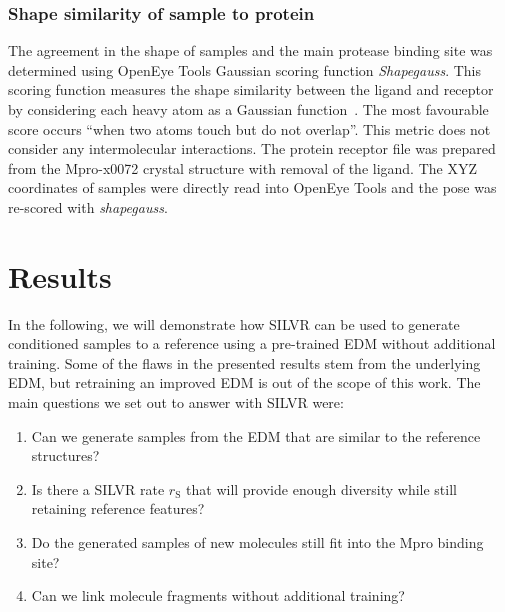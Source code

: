\documentclass[journal=jacsat,manuscript=article]{achemso}
\begin{document}
\subsubsection{Shape similarity of sample to protein}
The agreement in the shape of samples and the main protease binding site was determined using OpenEye Tools Gaussian scoring function \textit{Shapegauss}. This scoring function measures the shape similarity between the ligand and receptor by considering each heavy atom as a Gaussian function~\cite{mcgann2003gaussian}. The most favourable score occurs “when two atoms touch but do not overlap”.  This metric does not consider any intermolecular interactions. The protein receptor file was prepared from the Mpro-x0072 crystal structure with removal of the ligand. The XYZ coordinates of samples were directly read into OpenEye Tools and the pose was re-scored with \textit{shapegauss}. 


\section{Results}
In the following, we will demonstrate how SILVR can be used to generate conditioned samples to a reference using a pre-trained EDM without additional training. Some of the flaws in the presented results stem from the underlying EDM, but retraining an improved EDM is out of the scope of this work.  The main questions we set out to answer with SILVR were:
\begin{enumerate}
    \item Can we generate samples from the EDM that are similar to the reference structures?
    \item Is there a SILVR rate $r_{\mathrm{S}}$ that will provide enough diversity while still retaining reference features?
    \item Do the generated samples of new molecules still fit into the Mpro binding site?
    \item Can we link molecule fragments without additional training?
\end{enumerate}
\end{document}
